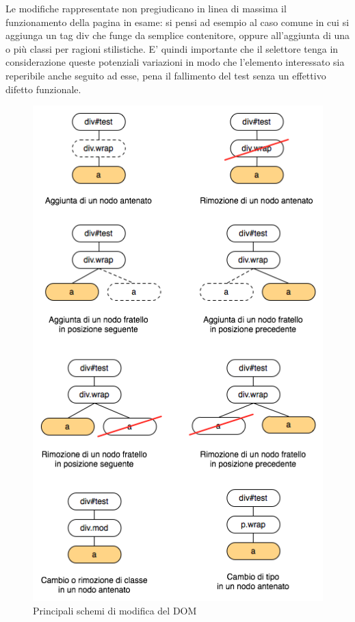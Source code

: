 \documentclass[12pt]{toptesi}
\begin{document}
Le modifiche rappresentate non pregiudicano in linea di massima il funzionamento della pagina in esame: si pensi ad esempio al caso comune in cui si aggiunga un tag div che funge da semplice contenitore, oppure all'aggiunta di una o più classi per ragioni stilistiche. E' quindi importante che il selettore tenga in considerazione queste potenziali variazioni in modo che l'elemento interessato sia reperibile anche seguito ad esse, pena il fallimento del test senza un effettivo difetto funzionale.

\begin{figure}[htbp]
\begin{center}
\includegraphics{images/dom_mod.png}
\caption{Principali schemi di modifica del DOM}
\label{fig:domMod}
\end{center}
\end{figure}
\end{document}
